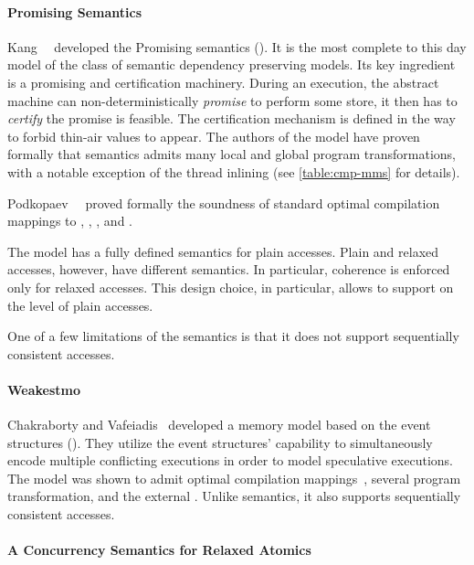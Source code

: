 \paragraph{Promising Semantics}

Kang~\etal~\cite{Kang-al:POPL17, Lee-al:PLDI20} developed 
the Promising semantics (\PRM).
It is the most complete to this day model of the class of
semantic dependency preserving models. 
Its key ingredient is a promising and certification machinery.
During an execution, the abstract machine can 
non-deterministically \emph{promise} to perform some store,
it then has to \emph{certify} the promise is feasible. 
The certification mechanism is defined in the way to forbid thin-air values to appear.
The authors of the model have proven formally 
that \Promising semantics admits many local and global program transformations,
with a notable exception of the thread inlining
(see \cref{table:cmp-mms} for details).

Podkopaev~\etal~\cite{Podkopaev-al:ECOOP17, Podkopaev-al:POPL19} 
proved formally the soundness of standard optimal 
compilation mappings to \Intel, , , and \POWER.

The model has a fully defined semantics for plain accesses.  
Plain and relaxed accesses, however, have different semantics.
In particular, coherence is enforced only for relaxed accesses. 
This design choice, in particular, allows to support 
\CSE on the level of plain accesses. 

One of a few limitations of the \Promising semantics is that 
it does not support sequentially consistent accesses. 

\paragraph{Weakestmo}

Chakraborty and Vafeiadis~\cite{Chakraborty-Vafeiadis:CGO17, Chakraborty-Vafeiadis:POPL19}
developed a memory model based on the event structures (\WMO). 
They utilize the event structures' capability to simultaneously encode 
multiple conflicting executions in order to model speculative executions.
The model was shown to admit optimal compilation mappings~\cite{Moiseenko-al:ECOOP20},
several program transformation, and the external \DRF.
Unlike \Promising semantics, it also supports 
sequentially consistent accesses.

\paragraph{A Concurrency Semantics for Relaxed Atomics}

